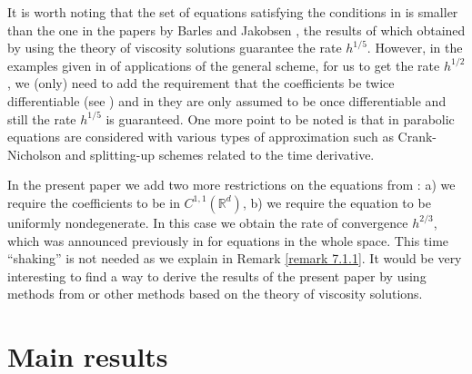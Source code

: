 \documentclass[11pt, reqno]{amsart}
\theoremstyle{definition}
\theoremstyle{remark}
\begin{document}
 
 It is worth noting that
the set of equations satisfying the conditions
 in \cite{DK07} is smaller than the one in the papers by
Barles and Jakobsen \cite{BJ05,BJ07}, the results of which
obtained by using the theory of viscosity solutions
  guarantee the rate $h^{1/5}$. However, in the  examples
given  in
\cite{BJ05,BJ07}
of applications of the general scheme,  
for us to get the rate $h^{1/2}$,
we (only) need to add the requirement  that
the coefficients be twice differentiable
(see \cite{Kr08})
and in \cite{BJ05,BJ07} they are only assumed to be 
once differentiable and still the rate $h^{1/5}$
is guaranteed. One more point to be noted is that
in \cite{BJ07} parabolic equations are considered
with various types of approximation such as 
Crank-Nicholson and splitting-up schemes
 related to the time
derivative.

In the present paper we add two more restrictions
on the equations from \cite{DK07}: a) we require the coefficients
to be in $C^{1,1}({\mathbb{R}}^{d})$,
b) we require the equation to be uniformly nondegenerate.
In this case we obtain the rate of convergence
$h^{2/3}$, which was announced previously in
\cite{Kr07} for equations in the whole space.
 This time ``shaking'' is not needed as we explain in
 Remark \ref{remark 7.1.1}. It would be
very interesting to find a way to derive the results
of the present paper by using methods from
\cite{BJ02,BJ05,BJ07} or other methods
based on the theory of viscosity solutions.

 {\section{{Main results}}
      \setcounter{equation}{0}}
                                     \label{section 1.22.1}
\end{document}
